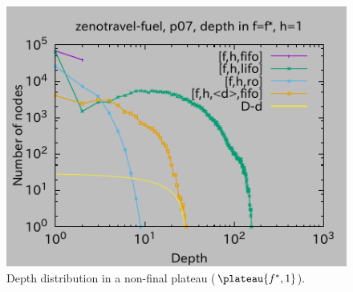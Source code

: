 \begin{figure}[htbp]
\includegraphics{img/depth1/zenotravel-fuel/p07.pdf}
 \caption{Depth distribution in a non-final plateau ($\plateau{f^*,1}$).}
 \label{fig:depth-histogram5}
\end{figure}

